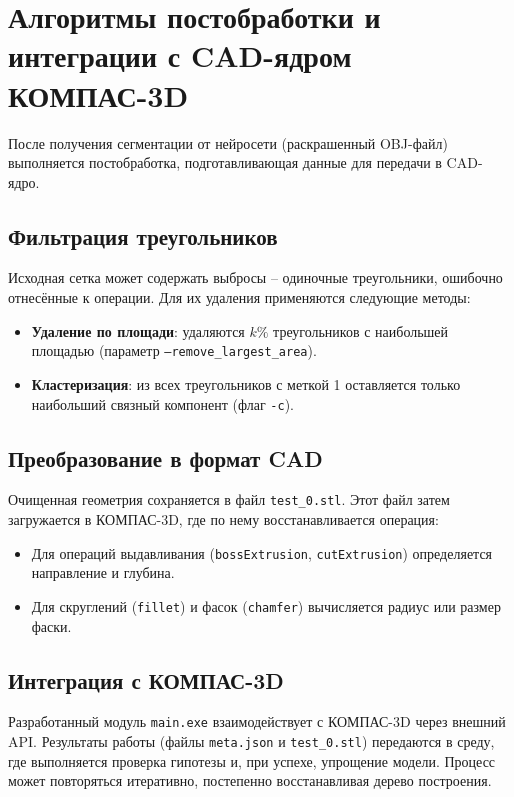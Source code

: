 \section{Алгоритмы постобработки и интеграции с CAD-ядром КОМПАС-3D}

После получения сегментации от нейросети (раскрашенный OBJ-файл) выполняется постобработка, подготавливающая данные для передачи в CAD-ядро.

\subsection{Фильтрация треугольников}
Исходная сетка может содержать выбросы – одиночные треугольники, ошибочно отнесённые к операции. Для их удаления применяются следующие методы:
\begin{itemize}
    \item \textbf{Удаление по площади}: удаляются $k\%$ треугольников с наибольшей площадью (параметр \texttt{--remove\_largest\_area}).
    \item \textbf{Кластеризация}: из всех треугольников с меткой 1 оставляется только наибольший связный компонент (флаг \texttt{-c}).
\end{itemize}

\subsection{Преобразование в формат CAD}
Очищенная геометрия сохраняется в файл \texttt{test\_0.stl}. Этот файл затем загружается в КОМПАС-3D, где по нему восстанавливается операция:
\begin{itemize}
    \item Для операций выдавливания (\texttt{bossExtrusion}, \texttt{cutExtrusion}) определяется направление и глубина.
    \item Для скруглений (\texttt{fillet}) и фасок (\texttt{chamfer}) вычисляется радиус или размер фаски.
\end{itemize}

\subsection{Интеграция с КОМПАС-3D}
Разработанный модуль \texttt{main.exe} взаимодействует с КОМПАС-3D через внешний API. Результаты работы (файлы \texttt{meta.json} и \texttt{test\_0.stl}) передаются в среду, где выполняется проверка гипотезы и, при успехе, упрощение модели. Процесс может повторяться итеративно, постепенно восстанавливая дерево построения.

